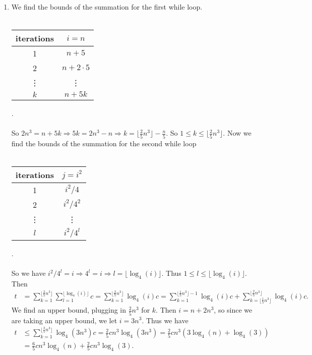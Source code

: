 \documentclass[10pt,oneside,reqno]{amsart}
\theoremstyle{plain}
\theoremstyle{definition}
\begin{document}
\begin{enumerate}[label=\arabic*.]
\begin{enumerate}
\item We find the bounds of the summation for the first while loop. \\\\
\begin{tabular}{c|c}
iterations & $i = n$\\
\hline
1 & $n + 5$\\
2 & $n + 2 \cdot 5$\\
\vdots & \vdots\\
$k$ & $n + 5k$
\end{tabular}.\\\\
So $2n^3 = n + 5k \Rightarrow 5k = 2n^3 - n \Rightarrow k = \boxed{\lfloor \frac{2}{5}n^3\rfloor} - \frac{n}{5}$. So $1 \leq k \leq \lfloor \frac{2}{5}n^3\rfloor$. 
Now we find the bounds of the summation for the second while loop\\\\
\begin{tabular}{c|c}
iterations & $j = i^2$\\
\hline
1 & $i^2/4$\\
2 & $i^2/4^2$\\
\vdots & \vdots\\
$l$ & $i^2/4^l$
\end{tabular}.\\\\
So we have $i^2/4^l = i \Rightarrow 4^l = i \Rightarrow l = \boxed{\lfloor \log_4(i)\rfloor.}$ Thus $1 \leq l \leq \lfloor \log_4(i) \rfloor$. Then
\begin{equation}
\begin{aligned}
t &= \sum_{k = 1}^{\lfloor \frac{2}{5}n^3\rfloor} \sum_{l = 1}^{\lfloor \log_4(i) \rfloor}c = \sum_{k = 1}^{\lfloor \frac{2}{5}n^3\rfloor} \log_4(i)c = \sum_{k = 1}^{\lfloor \frac{1}{5}n^3\rfloor - 1}\log_4(i)c + \sum_{k = \lfloor \frac{1}{5}n^3\rfloor}^{\lfloor \frac{2}{5}n^3\rfloor}\log_4(i)c. 
\end{aligned}
\end{equation}
We find an upper bound, plugging in $\frac{2}{5}n^3$ for $k$. Then $i = n + 2n^3$, so since we are taking an upper bound, we let $i = 3n^3$. Thus we have
\begin{equation}
\begin{aligned}
t &\leq \sum_{k = 1}^{\lfloor \frac{2}{5}n^3\rfloor} \log_4(3n^3)c = \frac{2}{5}cn^3 \log_4(3n^3) = \frac{2}{5}cn^3 (3\log_4(n) + \log_4(3))\\
&= \boxed{\frac{6}{5}cn^3\log_4(n) }+ \frac{2}{5}cn^3\log_4(3). 

\end{aligned}
\end{equation}
\end{enumerate}
\end{enumerate}
\end{document}
